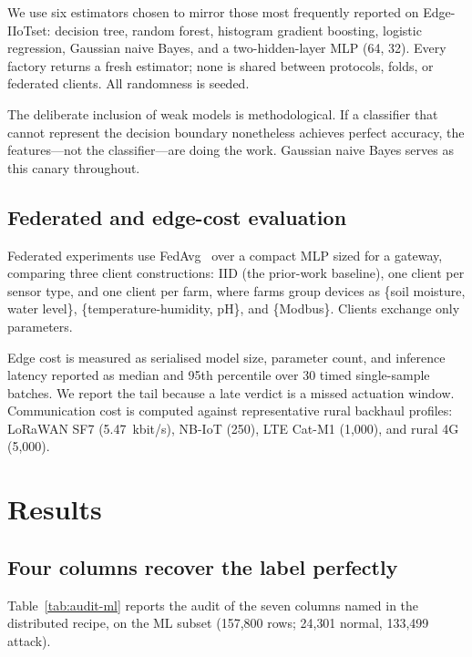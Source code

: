 We use six estimators chosen to mirror those most frequently reported on
Edge-IIoTset: decision tree, random forest, histogram gradient boosting,
logistic regression, Gaussian naive Bayes, and a two-hidden-layer MLP (64, 32).
Every factory returns a fresh estimator; none is shared between protocols,
folds, or federated clients. All randomness is seeded.

The deliberate inclusion of weak models is methodological. If a classifier that
cannot represent the decision boundary nonetheless achieves perfect accuracy,
the features---not the classifier---are doing the work. Gaussian naive Bayes
serves as this canary throughout.

\subsection{Federated and edge-cost evaluation}

Federated experiments use FedAvg~\cite{mcmahan2017fedavg} over a compact MLP
sized for a gateway, comparing three client constructions: IID (the prior-work
baseline), one client per sensor type, and one client per farm, where farms
group devices as \{soil moisture, water level\}, \{temperature-humidity, pH\},
and \{Modbus\}. Clients exchange only parameters.

Edge cost is measured as serialised model size, parameter count, and inference
latency reported as median and 95th percentile over 30 timed single-sample
batches. We report the tail because a late verdict is a missed actuation
window. Communication cost is computed against representative rural backhaul
profiles: LoRaWAN SF7 (5.47~kbit/s), NB-IoT (250), LTE Cat-M1 (1{,}000), and
rural 4G (5{,}000).

\section{Results}

\subsection{Four columns recover the label perfectly}
\label{sec:audit}

Table~\ref{tab:audit-ml} reports the audit of the seven columns named in the
distributed recipe, on the ML subset (157{,}800 rows; 24{,}301 normal,
133{,}499 attack).

